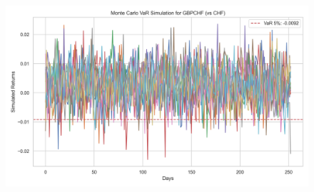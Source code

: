 \documentclass{article}
\begin{document}
\begin{figure}[H]
    \centering  \includegraphics[width=0.7\linewidth]{reports/figures/monte_carlo_var_simulation_GBPCHF_vs_CHF.png} \label{fig:monte_carlo_var_simulation_GBPCHF_vs_CHF}
\end{figure}

\printbibliography
\end{document}
